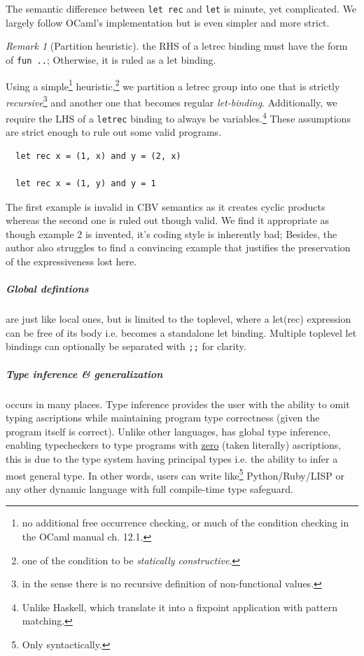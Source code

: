 \documentclass[a4paper, 11pt]{article}
\theoremstyle{remark}\newtheorem*{remark}{Remark}
\theoremstyle{definition}\newtheorem*{definition}{Definition}
\begin{document}
The semantic difference between \texttt{let rec} and \texttt{let} is minute, yet complicated. We largely follow OCaml's
implementation but is even simpler and more strict.
\begin{remark}[Partition heuristic]
  the RHS of a letrec binding must have the form of \texttt{fun ..}; Otherwise, it is ruled as a let binding.
\end{remark}
Using a simple\footnote{
  no additional free occurrence checking, or much of the condition checking
  in the OCaml manual ch. 12.1.
}
heuristic,\footnote{one of the condition to be \emph{statically constructive}.}
we partition a letrec group into one that is strictly
\emph{recursive}\footnote{
  in the sense there is no recursive definition of non-functional values.
}
and another one that becomes regular \emph{let-binding}.
Additionally, we require the LHS of a \texttt{letrec} binding to always be
variables.\footnote{
  Unlike Haskell, which translate it into a fixpoint application with pattern matching.
}
These assumptions are strict enough to rule out some valid programs.
\begin{verbatim}
  let rec x = (1, x) and y = (2, x)

  let rec x = (1, y) and y = 1
\end{verbatim}
The first example is invalid in CBV semantics as it creates cyclic products whereas
the second one is ruled out though valid. We find it appropriate as
though example 2 is invented, it's coding style is inherently bad; Besides, the author also struggles
to find a convincing example that justifies the preservation of the expressiveness lost here.
\subparagraph{Global defintions} are just like local ones, but is limited to the toplevel, where
a let(rec) expression can be free of its body i.e. becomes a standalone let binding. Multiple
toplevel let bindings can optionally be separated with \texttt{;;} for clarity.

\subparagraph{Type inference \& generalization} occurs in many places. Type inference
provides the user with the ability to omit typing ascriptions while maintaining program
type correctness (given the program itself is correct). Unlike other languages, \Tigris
has global type inference, enabling typecheckers to type programs with \underline{zero} (taken literally)
ascriptions, this is due to the type system having principal types i.e. the ability
to infer a most general type. In other words, users can write like\footnote{
  Only syntactically.
}
Python/Ruby/LISP or any other dynamic language with full compile-time type safeguard.
\end{document}
